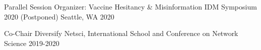 \vspace{-3mm}
\vspace{-2mm}
\begin{cvhonors}
\cvhonor
	{Parallel Session Organizer: Vaccine Hesitancy \& Misinformation} %
	{IDM Symposium 2020} %
	{(Postponed) Seattle, WA} %
	{2020} %



\cvhonor
	{Co-Chair} %
	{Diversify Netsci, International School and Conference on Network Science} %
	{} %
	{2019-2020} %




	
	

\end{cvhonors}
